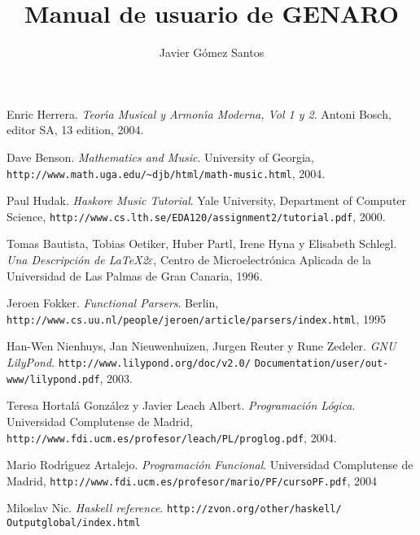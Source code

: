 \documentclass[a4paper,11pt]{article}
\author{Javier G\'omez Santos}
\title{Manual de usuario de GENARO}
\begin{document}
\begin{thebibliography}{9}

 Enric Herrera. \textit{Teor\'\i a Musical y Armon\'\i a Moderna, Vol 1 y 2}. Antoni Bosch, editor SA, 13 edition, 2004.

 Dave Benson. \textit{Mathematics and Music}. University of Georgia, \verb+http://www.math.uga.edu/~djb/html/math-music.html+, 2004.

 Paul Hudak. \textit{Haskore Music Tutorial}. Yale University, Department of Computer Science, \verb+http://www.cs.lth.se/EDA120/assignment2/tutorial.pdf+, 2000.

 Tomas Bautista, Tobias Oetiker, Huber Partl, Irene Hyna y Elisabeth Schlegl. \textit{Una Descripci\'on de \LaTeX 2$\varepsilon$}, Centro de Microelectr\'onica Aplicada de la Universidad de Las Palmas de Gran Canaria, 1996.

 Jeroen Fokker. \textit{Functional Parsers}. Berlin, \verb+http://www.cs.uu.nl/people/jeroen/article/parsers/index.html+, 1995

 Han-Wen Nienhuys, Jan Nieuwenhuizen, Jurgen Reuter y Rune Zedeler. \textit{GNU LilyPond}. \verb+http://www.lilypond.org/doc/v2.0/+ \verb+Documentation/user/out-www/lilypond.pdf+, 2003.

 Teresa Hortal\'a Gonz\'alez y Javier Leach Albert. \textit{Programaci\'on L\'ogica}. Universidad Complutense de Madrid, \verb+http://www.fdi.ucm.es/profesor/leach/PL/proglog.pdf+, 2004.

 Mario Rodr\'\i guez Artalejo. \textit{Programaci\'on Funcional}. Universidad Complutense de Madrid, \verb+http://www.fdi.ucm.es/profesor/mario/PF/cursoPF.pdf+, 2004

 Miloslav Nic. \textit{Haskell reference}. \verb+http://zvon.org/other/haskell/+ \verb+Outputglobal/index.html+

\end{thebibliography}
\end{document}
